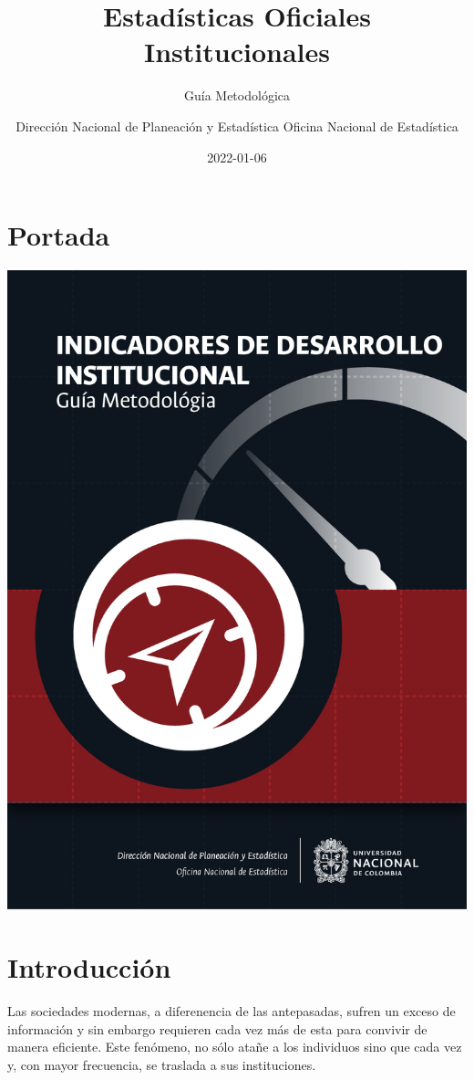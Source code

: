 \documentclass[
]{book}
\title{Estadísticas Oficiales Institucionales}
\subtitle{Guía Metodológica}
\author{Dirección Nacional de Planeación y Estadística Oficina Nacional de Estadística}
\date{2022-01-06}
\begin{document}
\maketitle

{
\setcounter{tocdepth}{1}
\tableofcontents
}
\hypertarget{portada}{%
\chapter*{Portada}\label{portada}}

\begin{center}\includegraphics[width=0.75\linewidth,]{imagenes/Portada} \end{center}

\hypertarget{intro}{%
\chapter{\texorpdfstring{\textbf{Introducción}}{Introducción}}\label{intro}}

Las sociedades modernas, a diferenencia de las antepasadas, sufren un exceso de información y sin embargo requieren cada vez más de esta para convivir de manera eficiente. Este fenómeno, no sólo atañe a los individuos sino que cada vez y, con mayor frecuencia, se traslada a sus instituciones.
\end{document}
